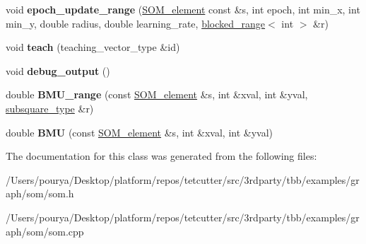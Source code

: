 \begin{DoxyCompactItemize}
\item 
\hypertarget{classSOMap_a50511f1717cbe5cfba57e714aaf424eb}{}void {\bfseries epoch\+\_\+update\+\_\+range} (\hyperlink{classSOM__element}{S\+O\+M\+\_\+element} const \&s, int epoch, int min\+\_\+x, int min\+\_\+y, double radius, double learning\+\_\+rate, \hyperlink{classtbb_1_1blocked__range}{blocked\+\_\+range}$<$ int $>$ \&r)\label{classSOMap_a50511f1717cbe5cfba57e714aaf424eb}

\item 
\hypertarget{classSOMap_a5a00b3b807263c86e73b5af9ed13ac70}{}void {\bfseries teach} (teaching\+\_\+vector\+\_\+type \&id)\label{classSOMap_a5a00b3b807263c86e73b5af9ed13ac70}

\item 
\hypertarget{classSOMap_a015dd6fa94ae51dc19618cb584e6f8e7}{}void {\bfseries debug\+\_\+output} ()\label{classSOMap_a015dd6fa94ae51dc19618cb584e6f8e7}

\item 
\hypertarget{classSOMap_a541406964c0a17c8ae3d6e13457a524d}{}double {\bfseries B\+M\+U\+\_\+range} (const \hyperlink{classSOM__element}{S\+O\+M\+\_\+element} \&s, int \&xval, int \&yval, \hyperlink{classtbb_1_1blocked__range2d}{subsquare\+\_\+type} \&r)\label{classSOMap_a541406964c0a17c8ae3d6e13457a524d}

\item 
\hypertarget{classSOMap_a67f6dc25af9ec62108aaaf25837bc142}{}double {\bfseries B\+M\+U} (const \hyperlink{classSOM__element}{S\+O\+M\+\_\+element} \&s, int \&xval, int \&yval)\label{classSOMap_a67f6dc25af9ec62108aaaf25837bc142}

\end{DoxyCompactItemize}


The documentation for this class was generated from the following files\+:\begin{DoxyCompactItemize}
\item 
/\+Users/pourya/\+Desktop/platform/repos/tetcutter/src/3rdparty/tbb/examples/graph/som/som.\+h\item 
/\+Users/pourya/\+Desktop/platform/repos/tetcutter/src/3rdparty/tbb/examples/graph/som/som.\+cpp\end{DoxyCompactItemize}

